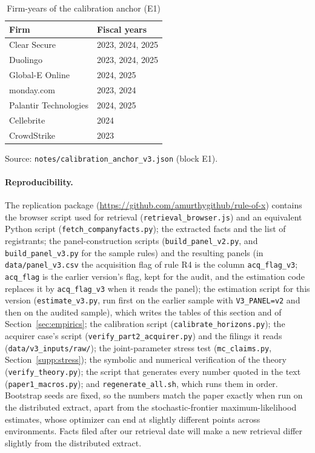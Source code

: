 \begin{table}[!ht]\centering\small
\caption{Firm-years of the calibration anchor (E1)}\label{tab:anchor-firms}
\begin{tabular}{@{}ll@{}}\toprule
Firm & Fiscal years\\\midrule
Clear Secure & 2023, 2024, 2025\\
Duolingo & 2023, 2024, 2025\\
Global-E Online & 2024, 2025\\
monday.com & 2023, 2024\\
Palantir Technologies & 2024, 2025\\
Cellebrite & 2024\\
CrowdStrike & 2023\\
\bottomrule\end{tabular}
\par\vspace{2pt}\footnotesize Source: \texttt{notes/calibration\_anchor\_v3.json} (block E1).
\end{table}


{\sloppy \paragraph{Reproducibility.} The replication package (\url{https://github.com/amurthygithub/rule-of-x}) contains the browser script used for retrieval (\texttt{retrieval\_browser.js}) and an equivalent Python script (\texttt{fetch\_companyfacts.py}); the extracted facts and the list of registrants; the panel-construction scripts (\texttt{build\_panel\_v2.py}, and \texttt{build\_panel\_v3.py} for the sample rules) and the resulting panels (in \texttt{data/panel\_v3.csv} the acquisition flag of rule R4 is the column \texttt{acq\_flag\_v3}; \texttt{acq\_flag} is the earlier version's flag, kept for the audit, and the estimation code replaces it by \texttt{acq\_flag\_v3} when it reads the panel); the estimation script for this version (\texttt{estimate\_v3.py}, run first on the earlier sample with \texttt{V3\_PANEL=v2} and then on the audited sample), which writes the tables of this section and of Section~\ref{sec:empirics}; the calibration script (\texttt{calibrate\_horizons.py}); the acquirer case's script (\texttt{verify\_part2\_acquirer.py}) and the filings it reads (\texttt{data/v3\_inputs/raw/}); the joint-parameter stress test (\texttt{mc\_claims.py}, Section~\ref{supp:stress}); the symbolic and numerical verification of the theory (\texttt{verify\_theory.py}); the script that generates every number quoted in the text (\texttt{paper1\_macros.py}); and \texttt{regenerate\_all.sh}, which runs them in order. Bootstrap seeds are fixed, so the numbers match the paper exactly when run on the distributed extract, apart from the stochastic-frontier maximum-likelihood estimates, whose optimizer can end at slightly different points across environments. Facts filed after our retrieval date will make a new retrieval differ slightly from the distributed extract.\par}
